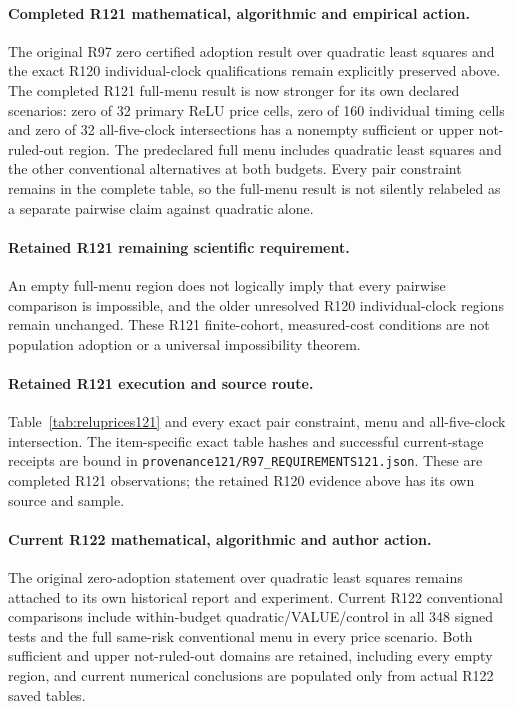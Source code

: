 \paragraph{Completed R121 mathematical, algorithmic and empirical action.}
The original R97 zero certified adoption result over quadratic least squares and the exact R120 individual-clock qualifications remain explicitly preserved above. The completed R121 full-menu result is now stronger for its own declared scenarios: zero of 32 primary ReLU price cells, zero of 160 individual timing cells and zero of 32 all-five-clock intersections has a nonempty sufficient or upper not-ruled-out region. The predeclared full menu includes quadratic least squares and the other conventional alternatives at both budgets. Every pair constraint remains in the complete table, so the full-menu result is not silently relabeled as a separate pairwise claim against quadratic alone.

\paragraph{Retained R121 remaining scientific requirement.}
An empty full-menu region does not logically imply that every pairwise comparison is impossible, and the older unresolved R120 individual-clock regions remain unchanged. These R121 finite-cohort, measured-cost conditions are not population adoption or a universal impossibility theorem.

\paragraph{Retained R121 execution and source route.}
Table~\ref{tab:reluprices121} and every exact pair constraint, menu and all-five-clock intersection.
The item-specific exact table hashes and successful current-stage receipts are bound in \nolinkurl{provenance121/R97_REQUIREMENTS121.json}. These are completed R121 observations; the retained R120 evidence above has its own source and sample.
\paragraph{Current R122 mathematical, algorithmic and author action.}
The original zero-adoption statement over quadratic least squares remains attached to its own historical report and experiment. Current R122 conventional comparisons include within-budget quadratic/VALUE/control in all 348 signed tests and the full same-risk conventional menu in every price scenario. Both sufficient and upper not-ruled-out domains are retained, including every empty region, and current numerical conclusions are populated only from actual R122 saved tables.
